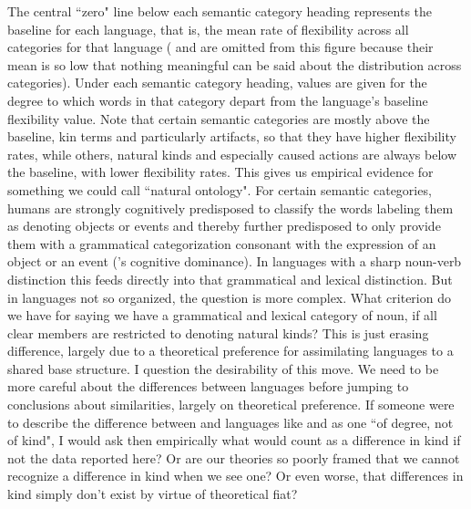 \documentclass[output=paper]{langsci/langscibook}
\begin{document}
\newpage 
The central ``zero" line below each semantic category heading represents the baseline for each language, that is, the mean rate of flexibility  across all categories for that language ( and  are omitted from this figure because their mean is so low that nothing meaningful can be said about the distribution across categories). Under each semantic category heading, values are given for the degree to which words in that category depart from the language's baseline flexibility value. Note that certain semantic categories are mostly above the baseline, kin terms and particularly artifacts, so that they have higher flexibility rates, while others, natural kinds and especially caused actions are always below the baseline, with lower flexibility  rates. This gives us empirical evidence for something we could call ``natural ontology".  For certain semantic categories, humans are strongly cognitively predisposed to classify the words labeling them as denoting objects or events and thereby further predisposed to only provide them with a grammatical categorization consonant with the expression of an object or an event (\citeauthor{GentnerEtAl2001}'s \citeyear{GentnerEtAl2001} cognitive dominance). In languages with a sharp noun-verb distinction  this feeds directly into that grammatical and lexical distinction. But in languages not so organized, the question is more complex. What criterion do we have for saying we have a grammatical and lexical category of noun, if all clear members are restricted to denoting natural kinds? This is just erasing difference, largely due to a theoretical preference for assimilating languages to a shared base structure. I question the desirability of this move. We need to be more careful about the differences between languages before jumping to conclusions about similarities, largely on theoretical preference. If someone were to describe the difference between  and languages like  and  as one ``of degree, not of kind", I would ask then empirically what would count as a difference in kind if not the data reported here? Or are our theories so poorly framed that we cannot recognize a difference in kind when we see one? Or even worse, that differences in kind simply don’t exist by virtue of theoretical fiat?



{\sloppy
\printbibliography[heading=subbibliography,notkeyword=this]
}
\end{document}
